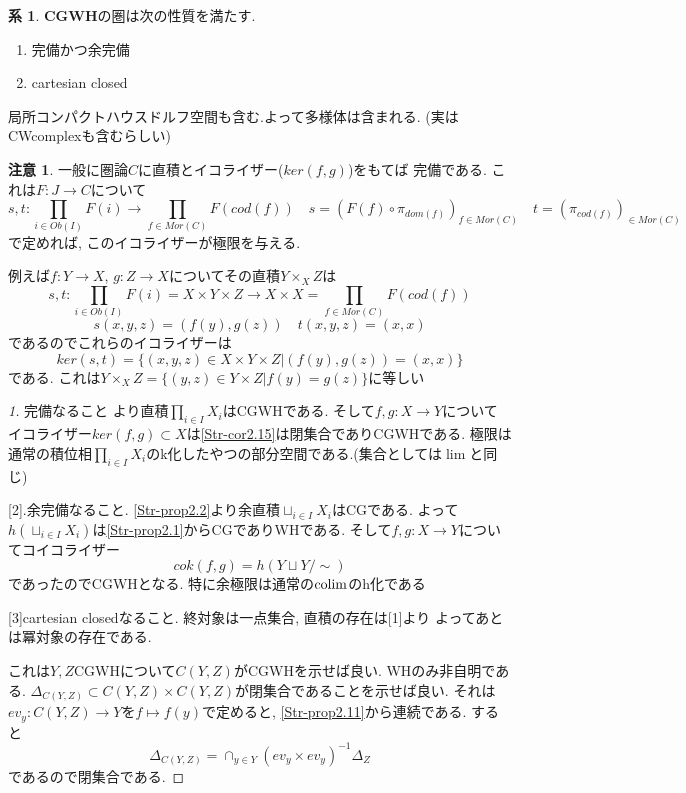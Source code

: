 \documentclass[dvipdfmx,a4paper,11pt]{article}
\newcommand{\colim}{{\rm colim}}
\theoremstyle{definition}
\newtheorem{cor}[thm]{系}
\newtheorem{rem}[thm]{注意}
\begin{document}
 \begin{tcolorbox}
 [colback = white, colframe = green!35!black, fonttitle = \bfseries,breakable = true]
\begin{cor}\cite[Cor2.23, Prop2.24]{Str}
{\bf CGWH}の圏は次の性質を満たす.
\begin{enumerate}
\item 完備かつ余完備
\item cartesian closed
\end{enumerate}
\end{cor}
\end{tcolorbox}
局所コンパクトハウスドルフ空間も含む.よって多様体は含まれる.  
(実はCWcomplexも含むらしい)

\begin{rem}
一般に圏論$C$に直積とイコライザー($ker(f,g)$)をもてば
完備である.
これは$F : J \to C$について
$$
s, t : \prod_{i  \in Ob(I)}F(i) \to\prod_{f \in Mor(C)} F(cod(f))
\quad s=(F(f) \circ \pi_{dom(f)}) _{f \in Mor(C)}
\quad t=(\pi_{cod(f)})_{ \in Mor(C)}
$$
で定めれば, このイコライザーが極限を与える.

例えば$f : Y\to X$, $g : Z\to X$についてその直積$Y\times_{X}Z$は
$$
s, t :\prod_{i  \in Ob(I)}F(i)=X \times Y \times Z \to X \times X =\prod_{f \in Mor(C)} F(cod(f))
$$
$$
 s(x,y,z) =  (f(y), g(z))
\quad t(x,y,z)=(x,x)
$$
であるのでこれらのイコライザーは
$$
ker(s,t)=\{(x,y,z)\in X \times Y \times Z | (f(y), g(z))=(x,x) \}
$$
である. これは$Y \times_{X}Z=\{(y,z)\in Y \times Z |f(y)=g(z)\}$に等しい
\end{rem}

\begin{proof}
[1]完備なること
\label{Str^cor2.16}より直積$\prod_{i \in I}X_i$はCGWHである. 
そして$f,g : X \to Y$について
イコライザー$ker(f,g) \subset X$は\ref{Str-cor2.15}は閉集合でありCGWHである.
極限は通常の積位相$\prod_{i \in I}X_i$のk化したやつの部分空間である.(集合としては$\lim$と同じ)

[2].余完備なること.
\ref{Str-prop2.2}より余直積$\sqcup_{i \in I}X_i$はCGである.
よって$h(\sqcup_{i \in I}X_i)$は\ref{Str-prop2.1}からCGでありWHである.
そして$f,g : X \to Y$についてコイコライザー
$$
cok(f,g)=h(Y \sqcup Y/\sim)
$$
であったのでCGWHとなる.
特に余極限は通常の$\colim$のh化である

[3]cartesian closedなること.
終対象は一点集合, 直積の存在は[1]より
よってあとは冪対象の存在である.

これは$Y,Z$CGWHについて$C(Y,Z)$がCGWHを示せば良い.
WHのみ非自明である. 
$\Delta_{C(Y,Z)} \subset C(Y,Z)\times C(Y,Z)$が閉集合であることを示せば良い.
それは$ev_y : C(Y,Z) \to Y$を$f\mapsto f(y)$で定めると, \ref{Str-prop2.11}から連続である. 
すると
$$
\Delta_{C(Y,Z)} = \cap_{y \in Y}(ev_y \times ev_y)^{-1}\Delta_{Z}
$$
であるので閉集合である. 
\end{proof}
\end{document}
